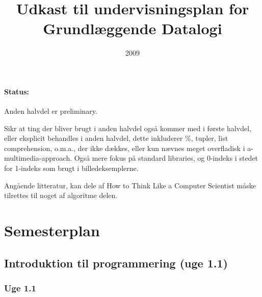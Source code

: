 \documentclass[12pt]{article}
\title{Udkast til undervisningsplan for \\Grundlæggende Datalogi}
\date{2009}
\begin{document}
\maketitle

\paragraph{Status:} 
Anden halvdel er preliminary.

Sikr at ting der bliver brugt i anden halvdel også kommer med i første halvdel, eller eksplicit behandles i anden halvdel, dette inkluderer \%, tupler, list comprehension, o.m.a., der ikke dækkes, eller kun nævnes meget overfladisk i a-multimedia-approach.
Også mere fokus på standard libraries, og 0-indeks i stedet for 1-indeks som brugt i billedeksemplerne.

Angående litteratur, kan dele af How to Think Like a Computer Scientist måske tilrettes til noget af algoritme delen.


\setcounter{tocdepth}{2}
\tableofcontents

\section{Semesterplan}
\subsection{Introduktion til programmering (uge 1.1)}

\subsubsection{Uge 1.1}
\end{document}

